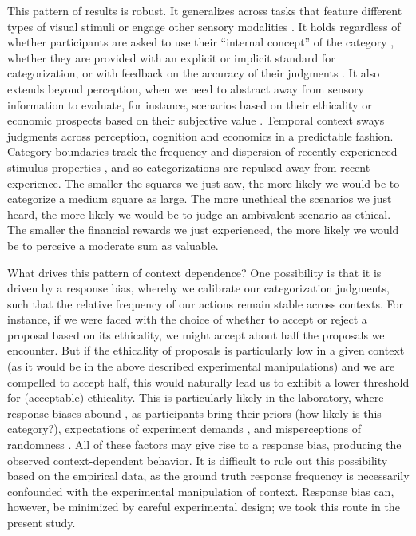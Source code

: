 \documentclass[a4paper, nobind]{templates/ociamthesis}
\begin{document}
This pattern of results is robust. It generalizes across tasks that feature different types of visual stimuli \autocites[e.g.~spatial frequency,][]{lages1998}[distance,][]{morgan2000}[hue,][]{olkkonen2014}[facial expression,][]{levari2018} or engage other sensory modalities \autocites[e.g.~weight perception,][]{helson1947}[interval timing,][]{jazayeri2010}. It holds regardless of whether participants are asked to use their ``internal concept'' of the category \autocite{levari2018}, whether they are provided with an explicit or implicit standard for categorization, or with feedback on the accuracy of their judgments \autocite{morgan2000}. It also extends beyond perception, when we need to abstract away from sensory information to evaluate, for instance, scenarios based on their ethicality \autocite[Fig. \ref{fig:cat-intro}b,][]{levari2018} or economic prospects based on their subjective value \autocite[Fig. \ref{fig:cat-intro}c,][]{rigoli2019}. Temporal context sways judgments across perception, cognition and economics in a predictable fashion. Category boundaries track the frequency and dispersion of recently experienced stimulus properties \autocite{parducci1965,rigoli2019}, and so categorizations are repulsed away from recent experience. The smaller the squares we just saw, the more likely we would be to categorize a medium square as large. The more unethical the scenarios we just heard, the more likely we would be to judge an ambivalent scenario as ethical. The smaller the financial rewards we just experienced, the more likely we would be to perceive a moderate sum as valuable.

What drives this pattern of context dependence? One possibility is that it is driven by a response bias, whereby we calibrate our categorization judgments, such that the relative frequency of our actions remain stable across contexts. For instance, if we were faced with the choice of whether to accept or reject a proposal based on its ethicality, we might accept about half the proposals we encounter. But if the ethicality of proposals is particularly low in a given context (as it would be in the above described experimental manipulations) and we are compelled to accept half, this would naturally lead us to exhibit a lower threshold for (acceptable) ethicality. This is particularly likely in the laboratory, where response biases abound \autocite{poulton1989,bonnet1990}, as participants bring their priors (how likely is this category?), expectations of experiment demands \autocite[how would the experimenter like me to categorize this?,][]{rosenthal1976}, and misperceptions of randomness \autocite[can chance produce this sequence of categories?,][]{bar-hillel1991}. All of these factors may give rise to a response bias, producing the observed context-dependent behavior. It is difficult to rule out this possibility based on the empirical data, as the ground truth response frequency is necessarily confounded with the experimental manipulation of context. Response bias can, however, be minimized by careful experimental design; we took this route in the present study.
\end{document}
